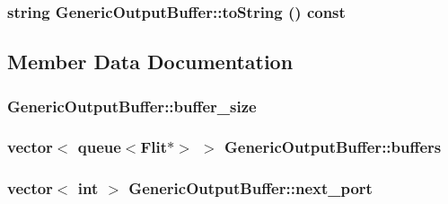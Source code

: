 \hypertarget{classGenericOutputBuffer_746612d97dbd6240764632638931d3fa}{
\subsubsection[{toString}]{\setlength{\rightskip}{0pt plus 5cm}string GenericOutputBuffer::toString () const}}
\label{classGenericOutputBuffer_746612d97dbd6240764632638931d3fa}




\subsection{Member Data Documentation}
\hypertarget{classGenericOutputBuffer_98d12e7f17f1ce56b89db973b9efe7b0}{
\subsubsection[{buffer\_\-size}]{ {\bf GenericOutputBuffer::buffer\_\-size}}}
\label{classGenericOutputBuffer_98d12e7f17f1ce56b89db973b9efe7b0}


\hypertarget{classGenericOutputBuffer_561cd725dc95f8c57fda666df9980313}{
\subsubsection[{buffers}]{\setlength{\rightskip}{0pt plus 5cm}vector$<$ queue$<${\bf Flit}$\ast$$>$ $>$ {\bf GenericOutputBuffer::buffers}}}
\label{classGenericOutputBuffer_561cd725dc95f8c57fda666df9980313}


\hypertarget{classGenericOutputBuffer_fadacb202322788766670e54b1d8430c}{
\subsubsection[{next\_\-port}]{\setlength{\rightskip}{0pt plus 5cm}vector$<$ int $>$ {\bf GenericOutputBuffer::next\_\-port}}}
\label{classGenericOutputBuffer_fadacb202322788766670e54b1d8430c}



